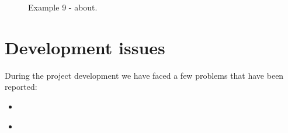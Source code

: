 \documentclass[11pt,a4paper]{article}
\begin{document}
\begin{figure}[H]
    \centering
    \caption{Example 9 - about.}
    \label{fig:example8}
\end{figure}

\newpage

\section{Development issues}

During the project development we have faced a few problems that have been reported:
\begin{itemize}
    \item \href{https://github.com/IBM-Bluemix-Docs/ContinuousDelivery/issues/13}{}
    \item \href{https://github.com/IBM-Cloud/aspnet-core-helloworld/issues/39}{\color{urlColor}{github.com/IBM-Cloud/aspnet-core-helloworld/issues/39}}
\end{itemize}
\end{document}
